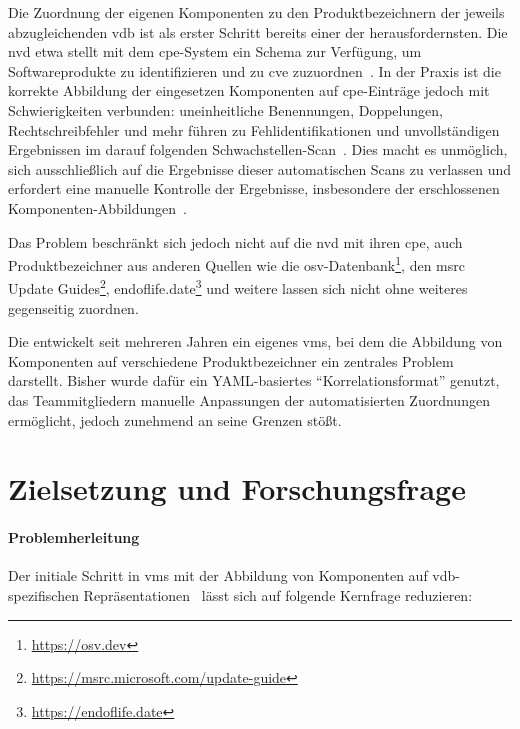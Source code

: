 Die Zuordnung der eigenen Komponenten zu den Produktbezeichnern der jeweils abzugleichenden \acrshort{vdb} ist als erster Schritt bereits einer der herausfordernsten.
Die \acrshort{nvd} etwa stellt mit dem \acrfull{cpe}-System ein Schema zur Verfügung, um Softwareprodukte zu identifizieren und zu \acrshort{cve} zuzuordnen\ \autocite{Cheikes_Waltermire_Scarfone_2011}.
In der Praxis ist die korrekte Abbildung der eingesetzen Komponenten auf \acrshort{cpe}-Einträge jedoch mit Schwierigkeiten verbunden:
uneinheitliche Benennungen, Doppelungen, Rechtschreibfehler und mehr führen zu Fehlidentifikationen und unvollständigen Ergebnissen im darauf folgenden Schwachstellen-Scan\ \autocite{Sanguino_Uetz_2017}.
Dies macht es unmöglich, sich ausschließlich auf die Ergebnisse dieser automatischen Scans zu verlassen und erfordert eine manuelle Kontrolle der Ergebnisse, insbesondere der erschlossenen Komponenten-Abbildungen\ \autocite{Sanguino_Uetz_2017}.

Das Problem beschränkt sich jedoch nicht auf die \acrshort{nvd} mit ihren \acrshort{cpe}, auch Produktbezeichner aus anderen Quellen wie die \acrfull{osv}-Datenbank\footnote{\url{https://osv.dev}}, den \acrfull{msrc} Update Guides\footnote{\url{https://msrc.microsoft.com/update-guide}}, endoflife.date\footnote{\url{https://endoflife.date}} und weitere lassen sich nicht ohne weiteres gegenseitig zuordnen.

Die \metaeffekt entwickelt seit mehreren Jahren ein eigenes \acrshort{vms}, bei dem die Abbildung von Komponenten auf verschiedene Produktbezeichner ein zentrales Problem darstellt.
Bisher wurde dafür ein YAML-basiertes \enquote{Korrelationsformat} genutzt, das Teammitgliedern manuelle Anpassungen der automatisierten Zuordnungen ermöglicht, jedoch zunehmend an seine Grenzen stößt.


\section{Zielsetzung und Forschungsfrage}\label{sec:ziel-forschungsfrage}

\paragraph{Problemherleitung}

Der initiale Schritt in \acrshort{vms} mit der Abbildung von Komponenten auf \acrshort{vdb}-spezifischen Repräsentationen\ \autocite{Idrissi_Sebai_Faroukhi_Mahouachi_2024} lässt sich auf folgende Kernfrage reduzieren:

